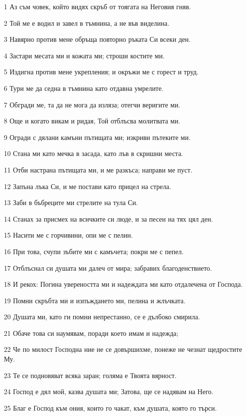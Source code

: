 \par 1 Аз съм човек, който видях скръб от тоягата на Неговия гняв.
\par 2 Той ме е водил и завел в тъмнина, а не във виделина.
\par 3 Навярно против мене обръща повторно ръката Си всеки ден.
\par 4 Застари месата ми и кожата ми; строши костите ми.
\par 5 Издигна против мене укрепления; и окръжи ме с горест и труд.
\par 6 Тури ме да седна в тъмнина като отдавна умрелите.
\par 7 Обгради ме, та да не мога да изляза; отегчи веригите ми.
\par 8 Още и когато викам и ридая, Той отблъсва молитвата ми.
\par 9 Огради с дялани камъни пътищата ми; изкриви пътеките ми.
\par 10 Стана ми като мечка в засада, като лъв в скришни места.
\par 11 Отби настрана пътищата ми, и ме разкъса; направи ме пуст.
\par 12 Запъна лъка Си, и ме постави като прицел на стрела.
\par 13 Заби в бъбреците ми стрелите на тула Си.
\par 14 Станах за присмех на всичките си люде, и за песен на тях цял ден.
\par 15 Насити ме с горчивини, опи ме с пелин.
\par 16 При това, счупи зъбите ми с камъчета; покри ме с пепел.
\par 17 Отблъснал си душата ми далеч от мира; забравих благоденствието.
\par 18 И рекох: Погина увереността ми и надеждата ми като отдалечена от Господа.
\par 19 Помни скръбта ми и изпъждането ми, пелина и жлъчката.
\par 20 Душата ми, като ги помни непрестанно, се е дълбоко смирила.
\par 21 Обаче това си наумявам, поради което имам и надежда;
\par 22 Че по милост Господна ние не се довършихме, понеже не чезнат щедростите Му.
\par 23 Те се подновяват всяка заран; голяма е Твоята вярност.
\par 24 Господ е дял мой, казва душата ми; Затова, ще се надявам на Него.
\par 25 Благ е Господ към ония, които го чакат, към душата, която го търси.
